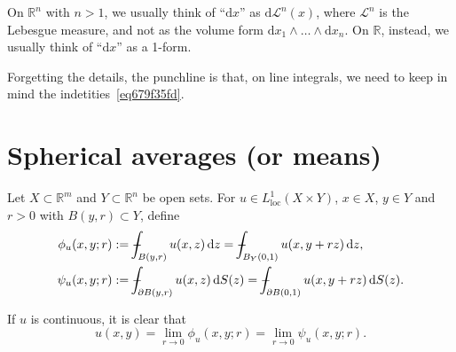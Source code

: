\documentclass[a4paper,9pt]{amsart}
\newcommand{\cal}[1]{\mathcal{#1}}
\newcommand{\R}{\mathbb{R}}	%
\newcommand{\dd}{\mathrm{d}}	%
\newcommand{\did}{\,\mathrm{d}}	%
\newcommand{\de}{\partial}		%
\newcommand{\loc}{\mathrm{loc}}
\def\Xint#1{\mathchoice
      {\XXint\displaystyle\textstyle{#1}}%
      {\XXint\textstyle\scriptstyle{#1}}%
      {\XXint\scriptstyle\scriptscriptstyle{#1}}%
      {\XXint\scriptscriptstyle\scriptscriptstyle{#1}}%
      \!\int}
\def\XXint#1#2#3{{\setbox0=\hbox{$#1{#2#3}{\int}$}
        \vcenter{\hbox{$#2#3$}}\kern-.5\wd0}}
\def\fint{\Xint-}
\theoremstyle{plain}
\theoremstyle{definition}
\theoremstyle{remark}
\begin{document}
On $\R^n$ with $n>1$, we usually think of ``$\dd x$'' as $\dd\cal L^n(x)$, where $\cal L^n$ is the Lebesgue measure, and not as the volume form $\dd x_1\wedge\dots\wedge\dd x_n$.
On $\R$, instead, we usually think of ``$\dd x$'' as a 1-form.

Forgetting the details, the punchline is that, on line integrals, we need to keep in mind the indetities~\eqref{eq679f35fd}.






\section{Spherical averages (or means)}\label{sec67bac9ff}

Let $X\subset\R^m$ and $Y\subset\R^n$ be open sets.
For $u\in L^1_\loc(X\times Y)$, $x\in X$, $y\in Y$ and $r>0$ with $B(y,r)\subset Y$, define
\begin{equation}\label{eq67bacbb5}
\begin{aligned}
	\phi_u(x,y;r) &:= \fint_{B(y,r)} u(x,z) \did z 
		= \fint_{B_Y(0,1)} u(x,y+rz) \did z , \\
	\psi_u(x,y;r) &:= \fint_{\de B(y,r)} u(x,z) \did S(z)
		= \fint_{\de B(0,1)} u(x,y+rz) \did S(z) .
\end{aligned}
\end{equation}

If $u$ is continuous, it is clear that 
\begin{equation}\label{eq67bad1c9}
	u(x,y) = \lim_{r\to 0}\phi_u(x,y;r) = \lim_{r\to 0}\psi_u(x,y;r) .
\end{equation}
\end{document}
